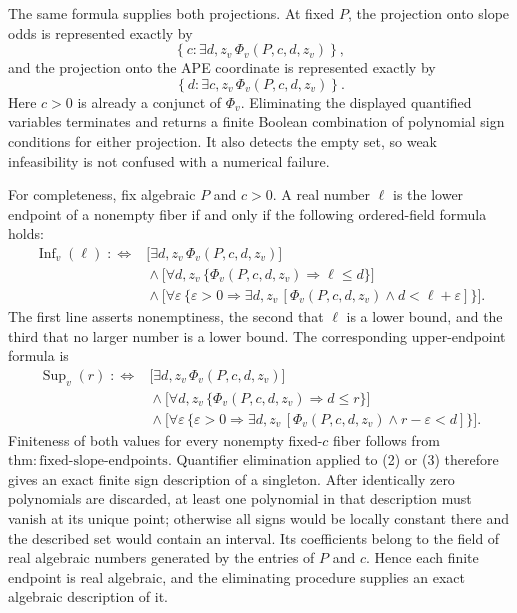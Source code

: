 The same formula supplies both projections.  At fixed \(P\), the projection onto slope odds is represented exactly by
\[
 \left\{c:\exists d,z_v\,\Phi_v(P,c,d,z_v)\right\},
\]
and the projection onto the APE coordinate is represented exactly by
\[
 \left\{d:\exists c,z_v\,\Phi_v(P,c,d,z_v)\right\}.
\]
Here \(c>0\) is already a conjunct of \(\Phi_v\).  Eliminating the displayed quantified variables terminates and returns a finite Boolean combination of polynomial sign conditions for either projection.  It also detects the empty set, so weak infeasibility is not confused with a numerical failure.

For completeness, fix algebraic \(P\) and \(c>0\).  A real number \(\ell\) is the lower endpoint of a nonempty fiber if and only if the following ordered-field formula holds:
\[
 \begin{split}
 \operatorname{Inf}_v(\ell)\;:\!\Longleftrightarrow{}&
 \bigl[\exists d,z_v\,\Phi_v(P,c,d,z_v)\bigr]\\
 &{}\wedge
 \bigl[\forall d,z_v\,\{\Phi_v(P,c,d,z_v)\Rightarrow \ell\le d\}\bigr]\\
 &{}\wedge
 \bigl[\forall\varepsilon\,\{\varepsilon>0\Rightarrow
 \exists d,z_v\,[\Phi_v(P,c,d,z_v)\wedge d<\ell+\varepsilon]\}\bigr].
 \end{split} \tag{2}
\]
The first line asserts nonemptiness, the second that \(\ell\) is a lower bound, and the third that no larger number is a lower bound.  The corresponding upper-endpoint formula is
\[
 \begin{split}
 \operatorname{Sup}_v(r)\;:\!\Longleftrightarrow{}&
 \bigl[\exists d,z_v\,\Phi_v(P,c,d,z_v)\bigr]\\
 &{}\wedge
 \bigl[\forall d,z_v\,\{\Phi_v(P,c,d,z_v)\Rightarrow d\le r\}\bigr]\\
 &{}\wedge
 \bigl[\forall\varepsilon\,\{\varepsilon>0\Rightarrow
 \exists d,z_v\,[\Phi_v(P,c,d,z_v)\wedge r-\varepsilon<d]\}\bigr].
 \end{split} \tag{3}
\]
Finiteness of both values for every nonempty fixed-\(c\) fiber follows from \(\mathrm{thm{:}fixed\text{-}slope\text{-}endpoints}\).  Quantifier elimination applied to (2) or (3) therefore gives an exact finite sign description of a singleton.  After identically zero polynomials are discarded, at least one polynomial in that description must vanish at its unique point; otherwise all signs would be locally constant there and the described set would contain an interval.  Its coefficients belong to the field of real algebraic numbers generated by the entries of \(P\) and \(c\).  Hence each finite endpoint is real algebraic, and the eliminating procedure supplies an exact algebraic description of it.

